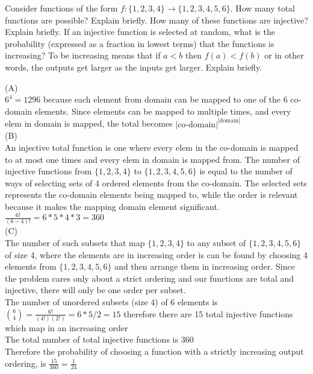 \documentclass[solution,letterpaper]{cs20}
\begin{document}
\begin{problem}
    Consider functions of the form $f : \{1,2,3,4\} \to \{1,2,3,4,5,6\}$.
    \subproblem How many total functions are possible? Explain briefly.
    \subproblem How many of these functions are injective? Explain briefly.
    \subproblem If an injective function is selected at random, what is the probability
    (expressed as a fraction in lowest terms) that the functions is increasing? To be
    increasing means that if $a < b$ then $f(a)< f(b)$ or in other words, the outputs
    get larger as the inputs get larger. Explain briefly.
    \begin{solution}
    (A) \\
    $6^4 = 1296$ because each element from domain can be mapped to one of the 6 co-domain elements. Since elements can be mapped to multiple times, and every elem in domain is mapped, the total becomes ${| \text{co-domain} |}^{| \text{domain} |}$ \\

    (B) \\
    An injective total function is one where every elem in the co-domain is mapped to at most one times and every elem in domain is mapped from.
    The number of injective functions from \( \{1, 2, 3, 4\} \) to \( \{1, 2, 3, 4, 5, 6\} \) is equal to the number of ways of selecting sets of 4 ordered elements from the co-domain. The selected sets represents the co-domain elements being mapped to, while the order is relevant because it makes the mapping domain element significant. \\
    $\frac{6!}{(6-4)!} = 6 * 5 * 4 * 3 = 360$ \\

    (C) \\
    The number of such subsets that map \( \{1, 2, 3, 4\} \) to any subset of \( \{1, 2, 3, 4, 5, 6\} \) of size 4, where the elements are in increasing order is can be found by choosing
    4 elements from \( \{1, 2, 3, 4, 5, 6\} \) and then arrange them in increasing order. Since the problem cares only about a strict ordering and our functions are total and injective, there will only be one order per subset. \\
    The number of unordered subsets (size 4) of 6 elements is $\binom{6}{4} = \frac{6!}{(4!)(2!)} = 6*5/2 = 15$ therefore there are 15 total injective functions which map in an increasing order \\
    The total number of total injective functions is 360 \\
    Therefore the probability of choosing a function with a strictly increasing output ordering, is $\frac{15}{360} = \frac{1}{24}$ \\


    \end{solution}
\end{problem}
\end{document}
